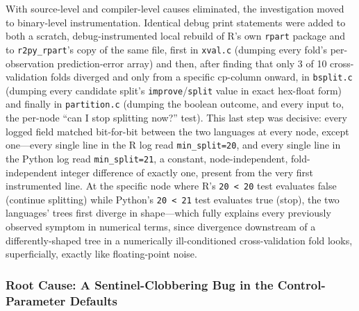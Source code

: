 \documentclass[12pt]{article}
\begin{document}
With source-level and compiler-level causes eliminated, the investigation moved to binary-level instrumentation. Identical debug print statements were added to both a scratch, debug-instrumented local rebuild of R's own \texttt{rpart} package and to \texttt{r2py\_rpart}'s copy of the same file, first in \texttt{xval.c} (dumping every fold's per-observation prediction-error array) and then, after finding that only 3 of 10 cross-validation folds diverged and only from a specific cp-column onward, in \texttt{bsplit.c} (dumping every candidate split's \texttt{improve}/\texttt{split} value in exact hex-float form) and finally in \texttt{partition.c} (dumping the boolean outcome, and every input to, the per-node ``can I stop splitting now?'' test). This last step was decisive: every logged field matched bit-for-bit between the two languages at every node, except one---every single line in the R log read \texttt{min\_split=20}, and every single line in the Python log read \texttt{min\_split=21}, a constant, node-independent, fold-independent integer difference of exactly one, present from the very first instrumented line. At the specific node where R's \texttt{20 < 20} test evaluates false (continue splitting) while Python's \texttt{20 < 21} test evaluates true (stop), the two languages' trees first diverge in shape---which fully explains every previously observed symptom in numerical terms, since divergence downstream of a differently-shaped tree in a numerically ill-conditioned cross-validation fold looks, superficially, exactly like floating-point noise.

\subsubsection{Root Cause: A Sentinel-Clobbering Bug in the Control-Parameter Defaults}
\end{document}

